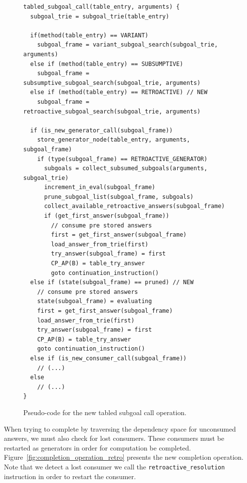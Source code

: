 \begin{figure}[ht]
\begin{Verbatim}
tabled_subgoal_call(table_entry, arguments) {
  subgoal_trie = subgoal_trie(table_entry)
  
  if(method(table_entry) == VARIANT)
    subgoal_frame = variant_subgoal_search(subgoal_trie, arguments)
  else if (method(table_entry) == SUBSUMPTIVE)
    subgoal_frame = subsumptive_subgoal_search(subgoal_trie, arguments)
  else if (method(table_entry) == RETROACTIVE) // NEW
    subgoal_frame = retroactive_subgoal_search(subgoal_trie, arguments)
  
  if (is_new_generator_call(subgoal_frame))
    store_generator_node(table_entry, arguments, subgoal_frame)
    if (type(subgoal_frame) == RETROACTIVE_GENERATOR)
      subgoals = collect_subsumed_subgoals(arguments, subgoal_trie)
      increment_in_eval(subgoal_frame)
      prune_subgoal_list(subgoal_frame, subgoals)
      collect_available_retroactive_answers(subgoal_frame)
      if (get_first_answer(subgoal_frame))
        // consume pre stored answers
        first = get_first_answer(subgoal_frame)
        load_answer_from_trie(first)
        try_answer(subgoal_frame) = first
        CP_AP(B) = table_try_answer
        goto continuation_instruction()
  else if (state(subgoal_frame) == pruned) // NEW
    // consume pre stored answers
    state(subgoal_frame) = evaluating
    first = get_first_answer(subgoal_frame)
    load_answer_from_trie(first)
    try_answer(subgoal_frame) = first
    CP_AP(B) = table_try_answer
    goto continuation_instruction()
  else if (is_new_consumer_call(subgoal_frame))
    // (...)
  else
    // (...)
}
\end{Verbatim}
\caption{Pseudo-code for the new tabled subgoal call operation.}
\label{fig:tabled_subgoal_call_retro}
\end{figure}

When trying to complete by traversing the dependency space for unconsumed answers, we must
also check for lost consumers. These consumers must be restarted as generators in order for
computation be completed. Figure~\ref{fig:completion_operation_retro} presents the new completion
operation. Note that we detect a lost consumer we call the \texttt{retroactive\_resolution}
instruction in order to restart the consumer.

